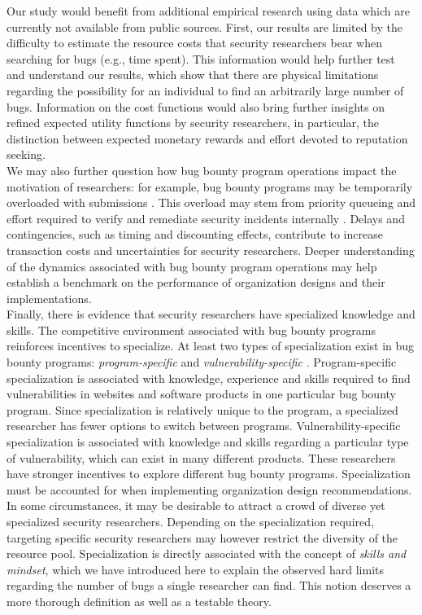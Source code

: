 Our study would benefit from additional empirical research using data which are currently not available from public sources. First, our results are limited by the difficulty to estimate the resource costs that security researchers bear when searching for bugs (e.g., time spent). This information would help further test and understand our results, which show that there are physical limitations regarding the possibility for an individual to find an arbitrarily large number of bugs. Information on the cost functions would also bring further insights on refined expected utility functions by security researchers, in particular, the distinction between expected monetary rewards and effort devoted to reputation seeking.\\

We may also further question how bug bounty program operations impact the motivation of researchers: for example, bug bounty programs may be temporarily overloaded with submissions \cite{zhao2014exploratory,zhao2015empirical}. This overload may stem from priority queueing \cite{maillart2011quantification} and effort required to verify and remediate security incidents internally \cite{kuypers2016empirical}. Delays and contingencies, such as timing and discounting effects, contribute to increase transaction costs and uncertainties for security researchers. Deeper understanding of the dynamics associated with bug bounty program operations may help establish a benchmark on the performance of organization designs and their implementations.\\

Finally, there is evidence that security researchers have specialized knowledge and skills. The competitive environment associated with bug bounty programs reinforces incentives to specialize. At least two types of specialization exist in bug bounty programs: {\it program-specific} and {\it vulnerability-specific} \cite{zhao2014exploratory,zhao2015empirical}. Program-specific specialization is associated with knowledge, experience and skills required to find vulnerabilities in websites and software products in one particular bug bounty program. Since specialization is relatively unique to the program, a specialized researcher has fewer options to switch between programs. Vulnerability-specific specialization is associated with knowledge and skills regarding a particular type of vulnerability, which can exist in many different products. These researchers have stronger incentives to explore different bug bounty programs. Specialization must be accounted for when implementing organization design recommendations. In some circumstances, it may be desirable to attract a crowd of diverse yet specialized security researchers. Depending on the specialization required, targeting specific security researchers may however restrict the diversity of the resource pool. Specialization is directly associated with the concept of {\it skills and mindset}, which we have introduced here to explain the observed hard limits regarding the number of bugs a single researcher can find. This notion deserves a more thorough definition as well as a testable theory.\\






